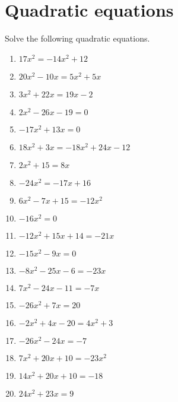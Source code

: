 \documentclass{article}
\begin{document}
    \section{Quadratic equations}
    Solve the following quadratic equations.
    \begin{multicols}{2}
    \begin{enumerate}
    \item $17 x^{2} = - 14 x^{2} + 12$
\item $20 x^{2} - 10 x = 5 x^{2} + 5 x$
\item $3 x^{2} + 22 x = 19 x -2$
\item $2 x^{2} - 26 x -19 = 0$
\item $- 17 x^{2} + 13 x = 0$
\item $18 x^{2} + 3 x = - 18 x^{2} + 24 x -12$
\item $2 x^{2} + 15 = 8 x$
\item $- 24 x^{2} = - 17 x + 16$
\item $6 x^{2} - 7 x + 15 = - 12 x^{2}$
\item $- 16 x^{2} = 0$
\item $- 12 x^{2} + 15 x + 14 = - 21 x$
\item $- 15 x^{2} - 9 x = 0$
\item $- 8 x^{2} - 25 x -6 = - 23 x$
\item $7 x^{2} - 24 x -11 = - 7 x$
\item $- 26 x^{2} + 7 x = 20$
\item $- 2 x^{2} + 4 x -20 = 4 x^{2} + 3$
\item $- 26 x^{2} - 24 x = -7$
\item $7 x^{2} + 20 x + 10 = - 23 x^{2}$
\item $14 x^{2} + 20 x + 10 = -18$
\item $24 x^{2} + 23 x = 9$
    \end{enumerate}
    \end{multicols}
    

    
\end{document}
